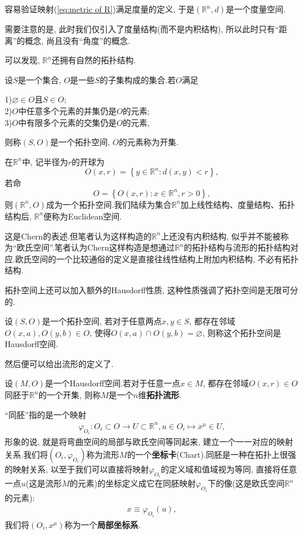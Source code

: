 容易验证映射(\ref{eq:metric of R})满足度量的定义, 于是$(\mathbb{R}^n,d)$是一个度量空间.
\begin{remark}
  需要注意的是, 此时我们仅引入了度量结构(而不是内积结构), 所以此时只有“距离”的概念, 尚且没有“角度”的概念.
\end{remark}
可以发现, $\mathbb{R}^n$还拥有自然的拓扑结构.
\begin{definition}
  设$S$是一个集合, $O$是一些$S$的子集构成的集合.若$O$满足

  1)$\varnothing\in O$且$S\in O$;\\
  2)$O$中任意多个元素的并集仍是$O$的元素;\\
  3)$O$中有限多个元素的交集仍是$O$的元素,

  则称$(S,O)$是一个拓扑空间, $O$的元素称为开集.
\end{definition}
在$\mathbb{R}^n$中, 记半径为$r$的开球为$$O(x,r)=\left\{y\in\mathbb{R}^n:d(x,y)<r\right\},$$若命
$$O=\left\{O(x,r):x\in\mathbb{R}^n,r>0\right\},$$
则$(\mathbb{R}^n,O)$成为一个拓扑空间.我们陆续为集合$\mathbb{R}^n$加上线性结构、度量结构、拓扑结构后, $\mathbb{R}^n$便称为Euclidean空间.
\begin{remark}
  这是Chern的表述.但笔者认为这样构造的$\mathbb{R}^n$上还没有内积结构, 似乎并不能被称为“欧氏空间”.笔者认为Chern这样构造是想通过$\mathbb{R}^n$的拓扑结构与流形的拓扑结构对应.欧氏空间的一个比较通俗的定义是直接往线性结构上附加内积结构, 不必有拓扑结构.
\end{remark}
拓扑空间上还可以加入额外的Hausdorff性质, 这种性质强调了拓扑空间是无限可分的.
\begin{definition}
  设$(S,O)$是一个拓扑空间, 若对于任意两点$x,y \in S$, 都存在邻域$O(x,a),O(y,b) \in O$, 使得$O(x,a)\cap O(y,b) = \varnothing$, 则称这个拓扑空间是Hausdorff空间.
\end{definition}
然后便可以给出流形的定义了.
\begin{definition}
  设$(M,O)$是一个Hausdorff空间.若对于任意一点$x\in M$, 都存在邻域$O(x,r) \in O$同胚于$\mathbb{R}^n$的一个开集, 则称$M$是一个$n$维\textbf{拓扑流形}.
\end{definition}
\begin{remark}
  “同胚”指的是一个映射
  \begin{equation}
    \begin{split}
      \varphi_{O_i}:O_i\subset O\rightarrow U\subset \mathbb{R}^n,u\in O_i\mapsto x^\mu\in U,
    \end{split}
  \end{equation}
  形象的说, 就是将弯曲空间的局部与欧氏空间等同起来, 建立一个一一对应的映射关系.我们将$(O_i,\varphi_{O_i})$称为流形$M$的一个\textbf{坐标卡}(Chart).同胚是一种在拓扑上很强的映射关系, 以至于我们可以直接将映射$\varphi_{O_i}$的定义域和值域视为等同, 直接将任意一点$u$(这是流形$M$的元素)的坐标定义成它在同胚映射$\varphi_{O_i}$下的像(这是欧氏空间$\mathbb{R}^n$的元素):
  \begin{equation}
    \begin{split}
      x\equiv \varphi_{O_i}(u),
    \end{split}
  \end{equation}
  我们将$(O_i,x^\mu)$称为一个\textbf{局部坐标系}.
\end{remark}

